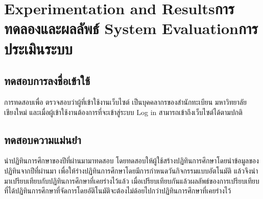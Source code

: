 \chapter{\ifproject%
\ifenglish Experimentation and Results\else การทดลองและผลลัพธ์\fi
\else%
\ifenglish System Evaluation\else การประเมินระบบ\fi
\fi}
\section{ทดสอบการลงชื่อเข้าใช้} 
   การทดสอบเพื่อ ตรวจสอบว่าผู้ที่เข้าใช้งานเว็บไซต์ เป็นบุคคลากรของสำนักทะเบียน มหาวิทยาลัยเชียงใหม่ 
และเมื่อผู้เข้าใช้งานต้องการที่จะเข้าสู่ระบบ Log in สามารถเข้าถึงเว็บไซต์ได้ตามปกติ
\section{ทดสอบความแม่นยำ}
   นำปฏิทินการศึกษาของปีที่ผ่านมามาทดสอบ โดยทดสอบให้ผู้ใช้สร้างปฏิทินการศึกษาโดยนำข้อมูลของปฏิทินจากปีที่ผ่านมา 
เพื่อให้ร่างปฏิทินการศึกษาโดยมีการกำหนดวันกิจกรรมแบบอัตโนมัติ แล้วจึงนำมาเปรียบเทียบกับปฏิทินการศึกษาที่เคยร่างไว้แล้ว 
เมื่อเปรียบเทียบกันแล้วผลลัพธ์ของการเปรียบเทียบที่ได้ปฏิทินการศึกษาที่จัดการโดยอัติโนมัติจะต้องไม่ด้อยไปกว่าปฏิทินการศึกษาที่เคยร่างไว้